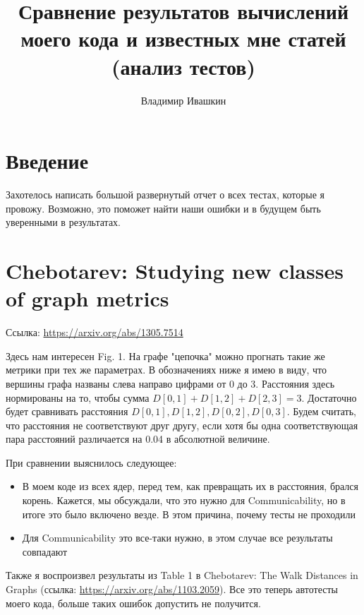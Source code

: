 \documentclass{article}
\title{
	Сравнение результатов вычислений моего кода и известных мне статей (анализ тестов)
}
\author{Владимир Ивашкин}
\begin{document}
\maketitle

\section{Введение}
Захотелось написать большой развернутый отчет о всех тестах, которые я провожу. Возможно, это поможет найти наши ошибки и в будущем быть уверенными в результатах.

\section{Chebotarev: Studying new classes of graph metrics}
Ссылка: \url{https://arxiv.org/abs/1305.7514}

Здесь нам интересен Fig. 1. На графе "цепочка" можно прогнать такие же метрики при тех же параметрах. В обозначениях ниже я имею в виду, что вершины графа названы слева направо цифрами от 0 до 3. Расстояния здесь нормированы на то, чтобы сумма $D[0, 1] + D[1, 2] + D[2, 3] = 3$.
Достаточно будет сравнивать расстояния $D[0, 1], D[1, 2], D[0, 2], D[0, 3]$.
Будем считать, что расстояния не соответствуют друг другу, если хотя бы одна соответствующая пара расстояний различается на 0.04 в абсолютной величине.

При сравнении выяснилось следующее:
\begin{itemize}
  \item В моем коде из всех ядер, перед тем, как превращать их в расстояния, брался корень. Кажется, мы обсуждали, что это нужно для Communicability, но в итоге это было включено везде. В этом причина, почему тесты не проходили
  \item Для Communicability это все-таки нужно, в этом случае все результаты совпадают
\end{itemize}

Также я воспроизвел результаты из Table 1 в Chebotarev: The Walk Distances in Graphs (ссылка: \url{https://arxiv.org/abs/1103.2059}).
Все это теперь автотесты моего кода, больше таких ошибок допустить не получится.
\end{document}

